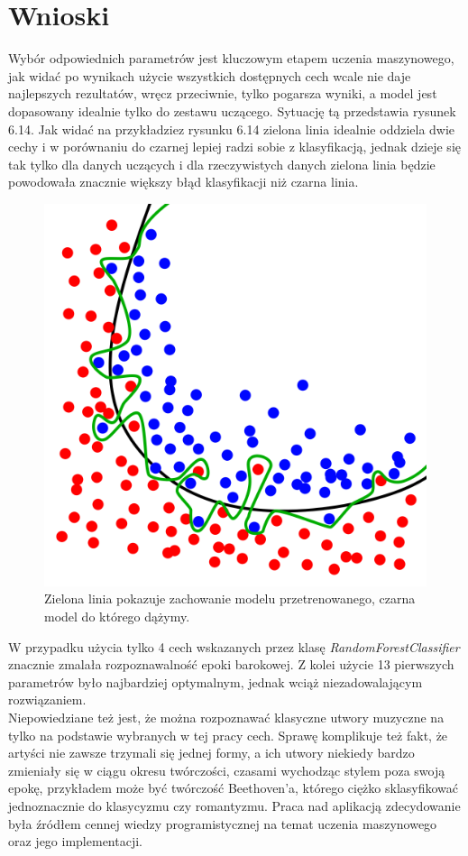 \documentclass[printmode, eng, openany]{mgr}
\newcommand\tab[1][1cm]{\hspace*{#1}}
\begin{document}
\section{Wnioski}
\tab Wybór odpowiednich parametrów jest kluczowym etapem uczenia maszynowego, jak widać po wynikach użycie wszystkich dostępnych cech wcale nie daje najlepszych rezultatów, wręcz przeciwnie, tylko pogarsza wyniki, a model jest dopasowany idealnie tylko do zestawu uczącego. Sytuację tą przedstawia rysunek 6.14. Jak widać na przykładzie\linebreak z rysunku 6.14 zielona linia idealnie oddziela dwie cechy i w porównaniu do czarnej lepiej radzi sobie z klasyfikacją, jednak dzieje się tak tylko dla danych uczących i dla rzeczywistych danych zielona linia będzie powodowała znacznie większy błąd klasyfikacji niż czarna linia.
\begin{figure}[H]
\centering
\includegraphics[scale=0.3]{overfitting.png}
\caption{Zielona linia pokazuje zachowanie modelu przetrenowanego, czarna model do którego dążymy. \cite{ovrimg}}
\end{figure}
\tab W przypadku użycia tylko 4 cech wskazanych przez klasę \textit{RandomForestClassifier} znacznie zmalała rozpoznawalność epoki barokowej. Z kolei użycie 13 pierwszych parametrów było najbardziej optymalnym, jednak wciąż niezadowalającym rozwiązaniem.\\
\tab Niepowiedziane też jest, że można rozpoznawać klasyczne utwory muzyczne na tylko na podstawie wybranych w tej pracy cech. Sprawę komplikuje też fakt, że artyści nie zawsze trzymali się jednej formy, a ich utwory niekiedy bardzo zmieniały się w ciągu okresu twórczości, czasami wychodząc stylem poza swoją epokę, przykładem może być twórczość Beethoven'a, którego ciężko sklasyfikować jednoznacznie do klasycyzmu czy romantyzmu.
\tab Praca nad aplikacją zdecydowanie była źródłem cennej wiedzy programistycznej na temat uczenia maszynowego oraz jego implementacji.
\end{document}
